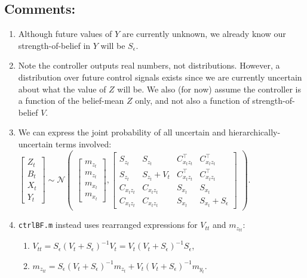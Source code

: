 \documentclass[9pt]{article}
\newcommand{\m}[1]{m_{#1}}                  %
\newcommand{\s}[1]{S_{#1}}                  %
\newcommand{\Sn}{\s{\epsilon}}              %
\newcommand{\now}[1]{#1_t}                  %
\newcommand{\pno}[1]{#1_{t}}  %
\newcommand{\uno}[1]{#1_{tt}}              %
\newcommand{\inv}{^{-1}}
\begin{document}
\subsection{Comments:}

\begin{enumerate} \itemsep0em
\item Although future values of $Y$ are currently unknown, we already know our strength-of-belief in $Y$ will be $\Sn$.
\item Note the controller outputs real numbers, not distributions. However, a distribution over future control signals exists since we are currently uncertain about what the value of $Z$ will be. We also (for now) assume the controller is a function of the belief-mean $Z$ only, and not also a function of strength-of-belief $V$.
 \item We can express the joint probability of all uncertain and hierarchically-uncertain terms involved: \\
 $\begin{bmatrix} \pno{Z} \\ \pno{B} \\ \now{X} \\ \now{Y} \end{bmatrix}
 \sim \mathcal{N} \begin{pmatrix}
 \begin{bmatrix} \m{\pno{z}} \\ \m{\pno{z}} \\ \m{\now{x}} \\ \m{\now{x}} \end{bmatrix},
 \begin{bmatrix} \s{\pno{z}}        & \s{\pno{z}}         & C_{\now{x}\pno{z}}^\top & C_{\now{x}\pno{z}}^\top \\
                 \s{\pno{z}}        & \s{\pno{z}}+\pno{V} & C_{\now{x}\pno{z}}^\top & C_{\now{x}\pno{z}}^\top \\
                 C_{\now{x}\pno{z}} & C_{\now{x}\pno{z}}  & \s{\now{x}}             & \s{\now{x}}             \\
                 C_{\now{x}\pno{z}} & C_{\now{x}\pno{z}}  & \s{\now{x}}             & \s{\now{x}}+\Sn
 \end{bmatrix} \end{pmatrix}$.
 \item \texttt{ctrlBF.m} instead uses rearranged expressions for $\uno{V}$ and $\m{\uno{z}}$:
 \begin{enumerate} \itemsep0em
  \item $\uno{V} = \Sn (\pno{V} + \Sn)\inv \pno{V} = \pno{V}(\pno{V} + \Sn)\inv \Sn$,
  \item $\m{\uno{z}}= \Sn(\pno{V} + \Sn)\inv \m{\pno{z}} + \pno{V}(\pno{V} + \Sn)\inv \m{\now{y}}$.
 \end{enumerate}
\end{enumerate}
\end{document}
